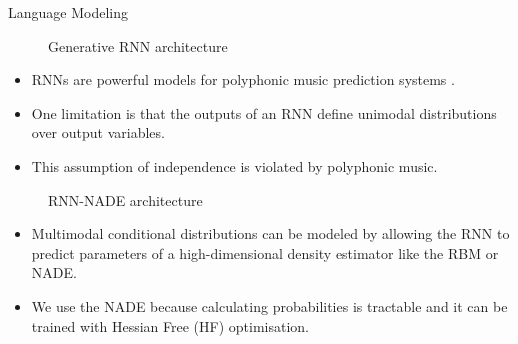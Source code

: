 \documentclass[final]{beamer}
\newlength{\onecolwid}
\begin{document}
\begin{frame}[t]
\begin{columns}[t]
\begin{column}{\onecolwid}


\begin{block}{Language Modeling}

\begin{figure}
\centering
\resizebox{800pt}{!}{}
\caption{Generative RNN architecture}
\end{figure}
\begin{itemize}
\item RNNs are powerful models for polyphonic music prediction systems \cite{boulanger2012modeling}. 
\item One limitation is that the outputs of an RNN define unimodal distributions over output variables. 
\item This assumption of independence is violated by polyphonic music. 
\end{itemize}
\begin{figure}
\caption{RNN-NADE architecture}
\end{figure}
\begin{itemize}
\item Multimodal conditional distributions can be modeled by allowing the RNN to predict parameters of a high-dimensional density estimator like the RBM or NADE. 
\item We use the NADE because calculating probabilities is tractable and it can be trained with Hessian Free (HF) optimisation. 
\end{itemize}
\end{block}



\end{column}
\end{columns}
\end{frame}
\end{document}
